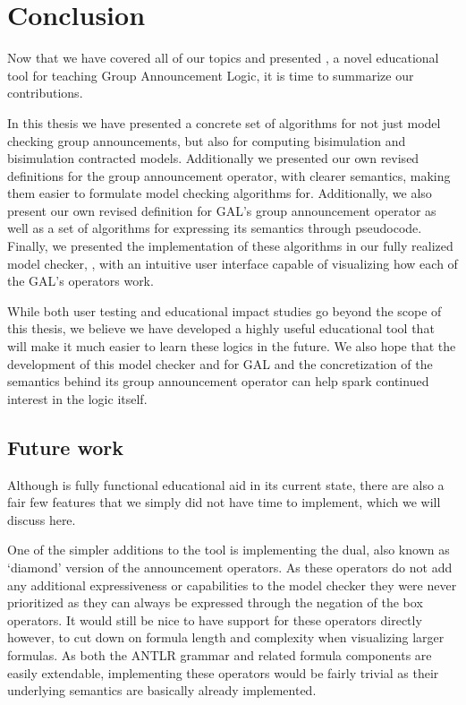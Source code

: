 \section{Conclusion}\label{sec:impl}


Now that we have covered all of our topics and presented \cname{}, a novel educational tool for teaching Group Announcement Logic, it is time to summarize our contributions.

In this thesis we have presented a concrete set of algorithms for not just model checking group announcements, but also for computing bisimulation and bisimulation contracted models. Additionally we presented our own revised definitions for the group announcement operator, with clearer semantics, making them easier to formulate model checking algorithms for. Additionally, we also present our own revised definition for GAL's group announcement operator as well as a set of algorithms for expressing its semantics through pseudocode. Finally, we presented the implementation of these algorithms in our fully realized model checker, \cname{}, with an intuitive user interface capable of visualizing how each of the GAL's operators work. 

While both user testing and educational impact studies go beyond the scope of this thesis, we believe we have developed a highly useful educational tool that will make it much easier to learn these logics in the future. We also hope that the development of this model checker and for GAL and the concretization of the semantics behind its group announcement operator can help spark continued interest in the logic itself.


\subsection{Future work}

Although \cname{} is fully functional educational aid in its current state, there are also a fair few features that we simply did not have time to implement, which we will discuss here.

One of the simpler additions to the tool is implementing the dual, also known as `diamond' version of the announcement operators. As these operators do not add any additional expressiveness or capabilities to the model checker they were never prioritized as they can always be expressed through the negation of the box operators. It would still be nice to have support for these operators directly however, to cut down on formula length and complexity when visualizing larger formulas. As both the ANTLR grammar and related formula components are easily extendable, implementing these operators would be fairly trivial as their underlying semantics are basically already implemented.

